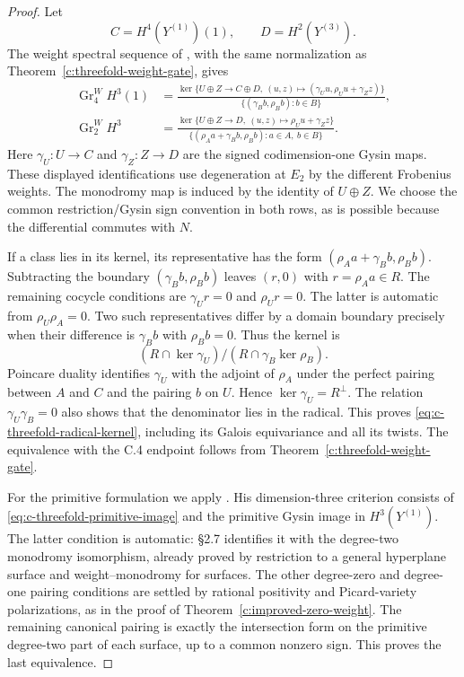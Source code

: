 \begin{proof}
Let
\[
 C=H^4(Y^{(1)})(1),\qquad D=H^2(Y^{(3)}).
\]
The weight spectral sequence of
\citet[Satz~2.10, formulas~(2.10.1)--(2.11)]{c_rapoportzink1982},
with the same normalization as Theorem~\ref{c:threefold-weight-gate},
gives
\[
 \begin{split}
 \operatorname{Gr}^W_4H^3(1)
  &=
  \frac{\ker\{U\oplus Z\longrightarrow C\oplus D,\ 
      (u,z)\longmapsto
      (\gamma_Uu,\rho_Uu+\gamma_Zz)\}}
       {\{(\gamma_Bb,\rho_Bb):b\in B\}},\\
 \operatorname{Gr}^W_2H^3
  &=
  \frac{\ker\{U\oplus Z\longrightarrow D,\
      (u,z)\longmapsto\rho_Uu+\gamma_Zz\}}
       {\{(\rho_Aa+\gamma_Bb,\rho_Bb):
                    a\in A,\ b\in B\}}.
 \end{split}
\]
Here $\gamma_U:U\to C$ and $\gamma_Z:Z\to D$ are the
signed codimension-one Gysin maps.
These displayed identifications use degeneration at $E_2$ by
the different Frobenius weights.  The monodromy map is induced
by the identity of $U\oplus Z$.  We choose the common
restriction/Gysin sign convention in both rows, as is possible
because the differential commutes with $N$.

If a class lies in its kernel, its representative has the form
$(\rho_Aa+\gamma_Bb,\rho_Bb)$.  Subtracting the boundary
$(\gamma_Bb,\rho_Bb)$ leaves $(r,0)$ with $r=\rho_Aa\in R$.
The remaining cocycle conditions are $\gamma_Ur=0$ and
$\rho_Ur=0$.  The latter is automatic from $\rho_U\rho_A=0$.
Two such representatives differ by a domain boundary precisely
when their difference is $\gamma_Bb$ with $\rho_Bb=0$.
Thus the kernel is
\[
 (R\cap\ker\gamma_U)/
       (R\cap\gamma_B\ker\rho_B).
 \]
Poincare duality identifies $\gamma_U$ with the adjoint of
$\rho_A$ under the perfect pairing between $A$ and $C$ and
the pairing $b$ on $U$.  Hence
$\ker\gamma_U=R^\perp$.
The relation $\gamma_U\gamma_B=0$ also shows that the denominator
lies in the radical.  This proves
\eqref{eq:c-threefold-radical-kernel}, including its Galois
equivariance and all its twists.
The equivalence with the C.4 endpoint follows from
Theorem~\ref{c:threefold-weight-gate}.

For the primitive formulation we apply
\citet[Theorem~0.2, complete proofs in \S\S1.1--2.5,
and the dimension-three converse in \S2.7,
author pp.~2--9]{c_msaito2003positivity}.
His dimension-three criterion consists of
\eqref{eq:c-threefold-primitive-image} and the primitive Gysin
image in $H^3(Y^{(1)})$.
The latter condition is automatic: \S2.7 identifies it with
the degree-two monodromy isomorphism, already proved by
restriction to a general hyperplane surface and
weight--monodromy for surfaces.
The other degree-zero and degree-one pairing conditions are
settled by rational positivity and Picard-variety
polarizations, as in the proof of
Theorem~\ref{c:improved-zero-weight}.
The remaining canonical pairing is exactly the intersection
form on the primitive degree-two part of each surface,
up to a common nonzero sign.  This proves the last equivalence.
\end{proof}

